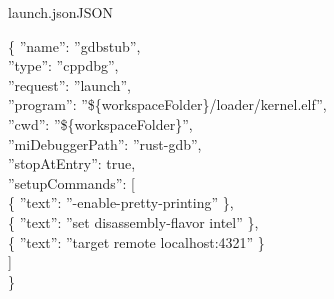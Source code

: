 \begin{codeblock}{launch.json}{JSON}
\begin{jsoncode}
\{
    ''name'': ''gdbstub'',\\
    ''type'': ''cppdbg'',\\
    ''request'': ''launch'',\\
    ''program'': ''\$\{workspaceFolder\}/loader/kernel.elf'', \\
    ''cwd'': ''\$\{workspaceFolder\}'',\\
    ''miDebuggerPath'': ''rust-gdb'',\\
    ''stopAtEntry'': true,\\
    ''setupCommands'': [\\
        \{
            ''text'': ''-enable-pretty-printing''
        \},\\
        \{
            ''text'': ''set disassembly-flavor intel''
        \},\\
        \{
            ''text'': ''target remote localhost:4321''
        \}\\
    ]\\
\}
\end{jsoncode}
\end{codeblock}